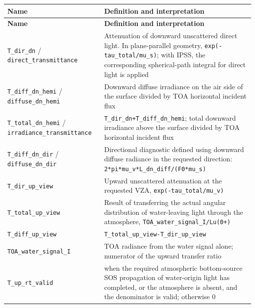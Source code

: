 {\TableFont
\begin{longtable}{@{}>{\raggedright\arraybackslash}p{}>{\raggedright\arraybackslash}p{}@{}}
\toprule
\textbf{Name} & \textbf{Definition and interpretation} \\
\midrule
\endfirsthead
\toprule
\textbf{Name} & \textbf{Definition and interpretation} \\
\midrule
\endhead
\bottomrule
\endfoot
\texttt{T\_\allowbreak{}dir\_\allowbreak{}dn} / \texttt{direct\_\allowbreak{}transmittance} & Attenuation of downward unscattered direct light. In plane-parallel geometry, \texttt{exp(-tau\_\allowbreak{}total/\allowbreak{}mu\_\allowbreak{}s)}; with IPSS, the corresponding spherical-path integral for direct light is applied \\
\texttt{T\_\allowbreak{}diff\_\allowbreak{}dn\_\allowbreak{}hemi} / \texttt{diffuse\_\allowbreak{}dn\_\allowbreak{}hemi} & Downward diffuse irradiance on the air side of the surface divided by TOA horizontal incident flux \\
\texttt{T\_\allowbreak{}total\_\allowbreak{}dn\_\allowbreak{}hemi} / \texttt{irradiance\_\allowbreak{}transmittance} & \texttt{T\_\allowbreak{}dir\_\allowbreak{}dn+T\_\allowbreak{}diff\_\allowbreak{}dn\_\allowbreak{}hemi}; total downward irradiance above the surface divided by TOA horizontal incident flux \\
\texttt{T\_\allowbreak{}diff\_\allowbreak{}dn\_\allowbreak{}dir} / \texttt{diffuse\_\allowbreak{}dn\_\allowbreak{}dir} & Directional diagnostic defined using downward diffuse radiance in the requested direction: \texttt{2*pi*mu\_\allowbreak{}v*L\_\allowbreak{}dn\_\allowbreak{}diff/\allowbreak{}(F0*mu\_\allowbreak{}s)} \\
\texttt{T\_\allowbreak{}dir\_\allowbreak{}up\_\allowbreak{}view} & Upward unscattered attenuation at the requested VZA, \texttt{exp(-tau\_\allowbreak{}total/\allowbreak{}mu\_\allowbreak{}v)} \\
\texttt{T\_\allowbreak{}total\_\allowbreak{}up\_\allowbreak{}view} & Result of transferring the actual angular distribution of water-leaving light through the atmosphere, \texttt{TOA\_\allowbreak{}water\_\allowbreak{}signal\_\allowbreak{}I/\allowbreak{}Lu(0+)} \\
\texttt{T\_\allowbreak{}diff\_\allowbreak{}up\_\allowbreak{}view} & \texttt{T\_\allowbreak{}total\_\allowbreak{}up\_\allowbreak{}view-T\_\allowbreak{}dir\_\allowbreak{}up\_\allowbreak{}view} \\
\texttt{TOA\_\allowbreak{}water\_\allowbreak{}signal\_\allowbreak{}I} & TOA radiance from the water signal alone; numerator of the upward transfer ratio \\
\texttt{T\_\allowbreak{}up\_\allowbreak{}rt\_\allowbreak{}valid} & 1 when the required atmospheric bottom-source SOS propagation of water-origin light has completed, or the atmosphere is absent, and the denominator is valid; otherwise 0 \\
\end{longtable}
}

